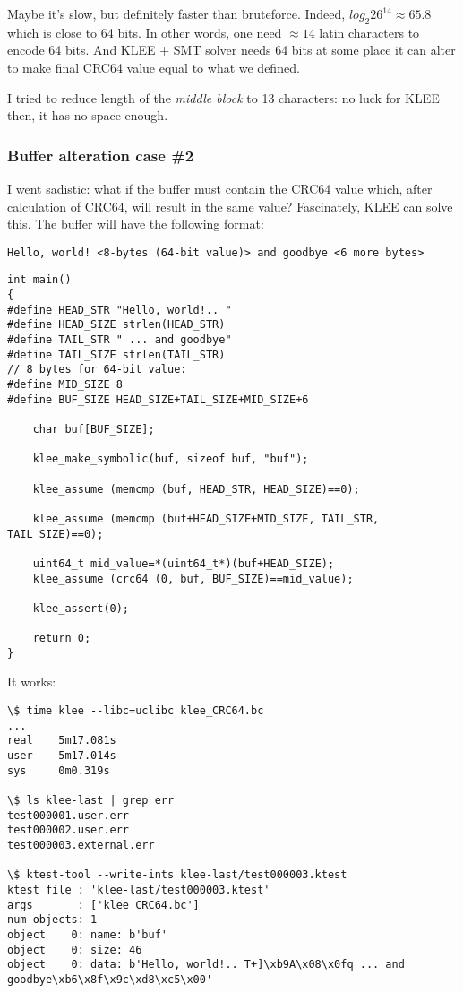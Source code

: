 Maybe it's slow, but definitely faster than bruteforce.
Indeed, $log_2{26^{14}} \approx 65.8$
which is close to 64 bits.
In other words, one need $\approx 14$ latin characters to encode 64 bits.
And KLEE + \ac{SMT} solver needs 64 bits at some place it can alter to make final CRC64 value equal to what we defined.

I tried to reduce length of the \textit{middle block} to 13 characters: no luck for KLEE then, it has no space enough.

\subsubsection{Buffer alteration case \#2}

I went sadistic: what if the buffer must contain the CRC64 value which, after calculation of CRC64, will result in the same value?
Fascinately, %
KLEE can solve this.
The buffer will have the following format:

\begin{lstlisting}
Hello, world! <8-bytes (64-bit value)> and goodbye <6 more bytes>
\end{lstlisting}

\begin{lstlisting}
int main()
{
#define HEAD_STR "Hello, world!.. "
#define HEAD_SIZE strlen(HEAD_STR)
#define TAIL_STR " ... and goodbye"
#define TAIL_SIZE strlen(TAIL_STR)
// 8 bytes for 64-bit value:
#define MID_SIZE 8
#define BUF_SIZE HEAD_SIZE+TAIL_SIZE+MID_SIZE+6

	char buf[BUF_SIZE];
  
	klee_make_symbolic(buf, sizeof buf, "buf");

	klee_assume (memcmp (buf, HEAD_STR, HEAD_SIZE)==0);

	klee_assume (memcmp (buf+HEAD_SIZE+MID_SIZE, TAIL_STR, TAIL_SIZE)==0);
	
	uint64_t mid_value=*(uint64_t*)(buf+HEAD_SIZE);
	klee_assume (crc64 (0, buf, BUF_SIZE)==mid_value);

	klee_assert(0);

	return 0;
}
\end{lstlisting}

It works:

\begin{lstlisting}
\$ time klee --libc=uclibc klee_CRC64.bc
...
real    5m17.081s
user    5m17.014s
sys     0m0.319s

\$ ls klee-last | grep err
test000001.user.err
test000002.user.err
test000003.external.err

\$ ktest-tool --write-ints klee-last/test000003.ktest
ktest file : 'klee-last/test000003.ktest'
args       : ['klee_CRC64.bc']
num objects: 1
object    0: name: b'buf'
object    0: size: 46
object    0: data: b'Hello, world!.. T+]\xb9A\x08\x0fq ... and goodbye\xb6\x8f\x9c\xd8\xc5\x00'
\end{lstlisting}

